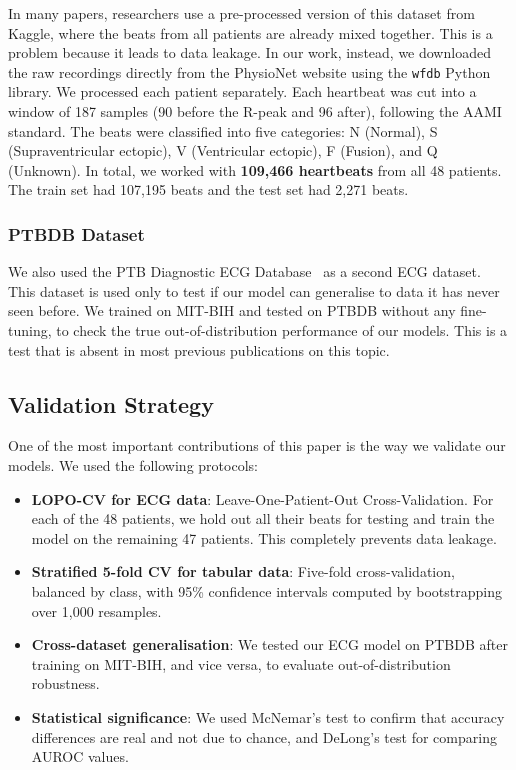 \documentclass[10pt, twocolumn]{article}
\begin{document}
In many papers, researchers use a pre-processed version of this dataset from Kaggle, where the
beats from all patients are already mixed together. This is a problem because it leads to data
leakage. In our work, instead, we downloaded the raw recordings directly from the PhysioNet
website using the \texttt{wfdb} Python library. We processed each patient separately.
Each heartbeat was cut into a window of 187 samples (90 before the R-peak and 96 after),
following the AAMI standard. The beats were classified into five categories:
N (Normal), S (Supraventricular ectopic), V (Ventricular ectopic), F (Fusion), and Q (Unknown).
In total, we worked with \textbf{109,466 heartbeats} from all 48 patients.
The train set had 107,195 beats and the test set had 2,271 beats.

\subsubsection{PTBDB Dataset}
We also used the PTB Diagnostic ECG Database~\cite{kaggle_heartbeat} as a second ECG dataset.
This dataset is used only to test if our model can generalise to data it has never seen before.
We trained on MIT-BIH and tested on PTBDB without any fine-tuning, to check the true
out-of-distribution performance of our models. This is a test that is absent in most
previous publications on this topic.

\subsection{Validation Strategy}

One of the most important contributions of this paper is the way we validate our models.
We used the following protocols:

\begin{itemize}[leftmargin=*]
  \item \textbf{LOPO-CV for ECG data}: Leave-One-Patient-Out Cross-Validation. For each
        of the 48 patients, we hold out all their beats for testing and train the model
        on the remaining 47 patients. This completely prevents data leakage.
  \item \textbf{Stratified 5-fold CV for tabular data}: Five-fold cross-validation,
        balanced by class, with 95\% confidence intervals computed by bootstrapping
        over 1,000 resamples.
  \item \textbf{Cross-dataset generalisation}: We tested our ECG model on PTBDB after
        training on MIT-BIH, and vice versa, to evaluate out-of-distribution robustness.
  \item \textbf{Statistical significance}: We used McNemar's test to confirm that
        accuracy differences are real and not due to chance, and DeLong's test for
        comparing AUROC values.
\end{itemize}
\end{document}
